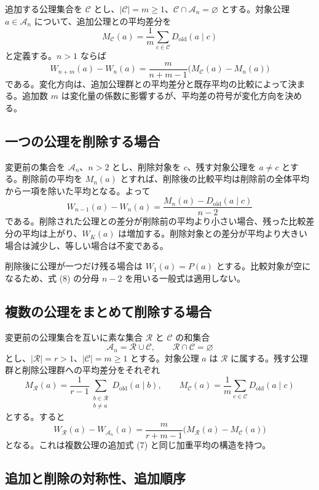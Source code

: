 \documentclass[a4paper,11pt]{ltjsarticle}
\begin{document}
追加する公理集合を $\mathcal C$ とし、$|\mathcal C|=m\ge1$、$\mathcal C\cap\mathcal A_n=\varnothing$ とする。対象公理 $a\in\mathcal A_n$ について、追加公理との平均差分を
\[
M_{\mathcal C}(a)=\frac1m\sum_{c\in\mathcal C}D_{\mathrm{old}}(a\mid c)
\]
と定義する。$n>1$ ならば
\[
\boxed{
W_{n+m}(a)-W_n(a)
=\frac{m}{n+m-1}
\bigl(M_{\mathcal C}(a)-M_n(a)\bigr)
}
\tag{7}
\]
である。変化方向は、追加公理群との平均差分と既存平均の比較によって決まる。追加数 $m$ は変化量の係数に影響するが、平均差の符号が変化方向を決める。

\subsection{一つの公理を削除する場合}

変更前の集合を $\mathcal A_n$、$n>2$ とし、削除対象を $c$、残す対象公理を $a\ne c$ とする。削除前の平均を $M_n(a)$ とすれば、削除後の比較平均は削除前の全体平均から一項を除いた平均となる。よって
\[
\boxed{
W_{n-1}(a)-W_n(a)
=\frac{M_n(a)-D_{\mathrm{old}}(a\mid c)}{n-2}
}
\tag{8}
\]
である。削除された公理との差分が削除前の平均より小さい場合、残った比較差分の平均は上がり、$W_K(a)$ は増加する。削除対象との差分が平均より大きい場合は減少し、等しい場合は不変である。

削除後に公理が一つだけ残る場合は $W_1(a)=P(a)$ とする。比較対象が空になるため、式 (8) の分母 $n-2$ を用いる一般式は適用しない。

\subsection{複数の公理をまとめて削除する場合}

変更前の公理集合を互いに素な集合 $\mathcal R$ と $\mathcal C$ の和集合
\[
\mathcal A_n=\mathcal R\cup\mathcal C,\qquad
\mathcal R\cap\mathcal C=\varnothing
\]
とし、$|\mathcal R|=r>1$、$|\mathcal C|=m\ge1$ とする。対象公理 $a$ は $\mathcal R$ に属する。残す公理群と削除公理群への平均差分をそれぞれ
\[
M_{\mathcal R}(a)=\frac1{r-1}\sum_{\substack{b\in\mathcal R\\b\ne a}}D_{\mathrm{old}}(a\mid b),\qquad
M_{\mathcal C}(a)=\frac1m\sum_{c\in\mathcal C}D_{\mathrm{old}}(a\mid c)
\]
とする。すると
\[
\boxed{
W_{\mathcal R}(a)-W_{\mathcal A_n}(a)
=\frac{m}{r+m-1}
\bigl(M_{\mathcal R}(a)-M_{\mathcal C}(a)\bigr)
}
\tag{9}
\]
となる。これは複数公理の追加式 (7) と同じ加重平均の構造を持つ。

\subsection{追加と削除の対称性、追加順序}
\end{document}
